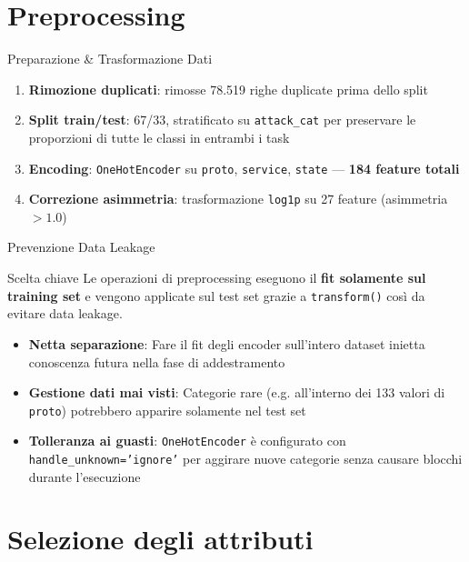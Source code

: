 \documentclass{beamer}
\begin{document}
\section{Preprocessing}

\begin{frame}{Preparazione \& Trasformazione Dati}
  \begin{enumerate}
    \item \textbf{Rimozione duplicati}: rimosse 78.519 righe duplicate prima dello split
    \item \textbf{Split train/test}: 67/33, stratificato su \texttt{attack\_cat} per preservare le proporzioni di tutte le classi in entrambi i task
    \item \textbf{Encoding}: \texttt{OneHotEncoder} su \texttt{proto},
      \texttt{service}, \texttt{state} — \textbf{184 feature totali}
    \item \textbf{Correzione asimmetria}: trasformazione \texttt{log1p} su 27 feature (asimmetria $> 1.0$)
  \end{enumerate}
\end{frame}

\begin{frame}{Prevenzione Data Leakage}
  \begin{alertblock}{Scelta chiave}
    Le operazioni di preprocessing eseguono il \textbf{fit solamente sul training set} e vengono applicate sul test set grazie a \texttt{transform()} così da evitare data leakage.
  \end{alertblock}
  \vspace{0.3cm}
  \begin{itemize}
    \item \textbf{Netta separazione}: Fare il fit degli encoder sull'intero dataset  inietta conoscenza futura nella fase di addestramento
    \item \textbf{Gestione dati mai visti}: Categorie rare (e.g. all'interno dei 133 valori di \texttt{proto}) potrebbero apparire solamente nel test set
    \item \textbf{Tolleranza ai guasti}: \texttt{OneHotEncoder} è configurato con \texttt{handle\_unknown='ignore'} per aggirare nuove categorie senza causare blocchi durante l'esecuzione
  \end{itemize}
\end{frame}

\section{Selezione degli attributi}
\end{document}
